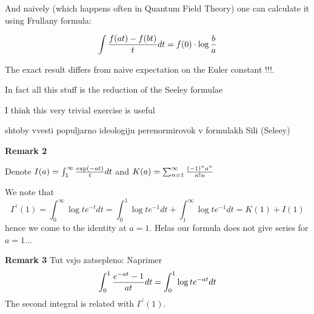       And naively (which happens often in Quantum Field Theory)
      one can calculate it using
   Frullany formula:

                       $$
                \int {f(at)-f(bt)\over t}dt=f(0)\cdot\log{b\over a}
                             $$

  The exact result
  differs  from naive expectation on the Euler constant !!!.

   In fact all this stuff is the reduction of the Seeley formulae




   \bigskip

   I think this very trivial exercise is useful

   shtoby vvesti
populjarno ideologiju perenormirovok v formulakh Sili (Seleey)




{\bf Remark 2}

Denote $I(a)=\int_1^\infty {\exp(-at)\over t}dt$ and
$K(a)=\sum_{n=1}^\infty {(-1)^na^n\over
n!n}$

 We note that
                $$
            \Gamma^\prime(1)=\int_0^\infty \log t e^{-t}dt=
\int_0^1 \log t e^{-1}dt+\int_1^\infty \log t e^{-1}dt=
         K(1)+I(1)
           $$
 hence we come to
 the identity at $a=1$. Helas our formula does not give
 series for $a=1$...

 {\bf Remark 3} Tut vsjo zatsepleno: Naprimer
                       $$
                       \int_0^1 {e^{-at}-1\over at}dt=
                       \int_0^1 \log t e^{-at}dt
                       $$
            The second integral is related with $\Gamma^\prime(1)$.

            

 \bye
